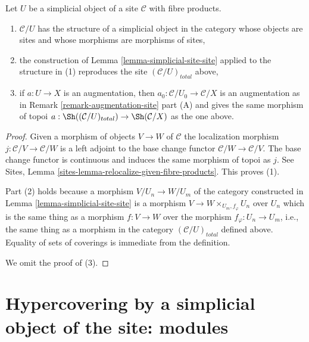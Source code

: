 \begin{lemma}
\label{lemma-sr-when-fibre-products}
Let $U$ be a simplicial object of a site $\mathcal{C}$
with fibre products.
\begin{enumerate}
\item $\mathcal{C}/U$ has the structure of a simplicial object
in the category whose objects are sites and
whose morphisms are morphisms of sites,
\item the construction of Lemma \ref{lemma-simplicial-site-site}
applied to the structure in (1)
reproduces the site $(\mathcal{C}/U)_{total}$ above,
\item if $a : U \to X$ is an augmentation, then
$a_0 : \mathcal{C}/U_0 \to \mathcal{C}/X$ is an augmentation
as in Remark \ref{remark-augmentation-site} part (A) and gives the
same morphism of topoi
$a : \Sh((\mathcal{C}/U)_{total}) \to \Sh(\mathcal{C}/X)$
as the one above.
\end{enumerate}
\end{lemma}

\begin{proof}
Given a morphism of objects $V \to W$ of $\mathcal{C}$ the localization
morphism $j : \mathcal{C}/V \to \mathcal{C}/W$ is a left adjoint to
the base change functor $\mathcal{C}/W \to \mathcal{C}/V$.
The base change functor is continuous and induces the same morphism of
topoi as $j$. See
Sites, Lemma \ref{sites-lemma-relocalize-given-fibre-products}.
This proves (1).

\medskip\noindent
Part (2) holds because a morphism $V/U_n \to W/U_m$
of the category constructed
in Lemma \ref{lemma-simplicial-site-site}
is a morphism $V \to W \times_{U_m, f_\varphi} U_n$ over $U_n$
which is the same thing as a morphism $f : V \to W$
over the morphism $f_\varphi : U_n \to U_m$, i.e.,
the same thing as a morphism in the category $(\mathcal{C}/U)_{total}$
defined above. Equality of sets of coverings is
immediate from the definition.

\medskip\noindent
We omit the proof of (3).
\end{proof}







\section{Hypercovering by a simplicial object of the site: modules}
\label{section-hypercovering-modules}

